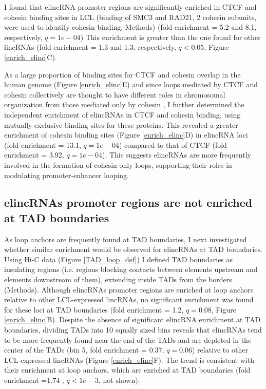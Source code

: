 \documentclass[11pt,a4paper]{report}
\begin{document}
I found that elincRNA promoter regions are significantly enriched in CTCF and cohesin binding sites in LCL (binding of SMC3 and RAD21, 2 cohesin subunits, were used to identify cohesin binding, Methods) (fold enrichment = 5.2 and 8.1, respectively, $q=1e-04$) This enrichment is greater than the one found for other lincRNAs (fold enrichment = 1.3 and 1.3, respectively, $q<0.05$, Figure \ref{enrich_elinc}C).

As a large proportion of binding sites for CTCF and cohesin overlap in the human genome (Figure \ref{enrich_elinc}E) and since loops mediated by CTCF and cohesin collectively are thought to have different roles in chromosomal organization from those mediated only by cohesin \cite{Ji2016}⁠, I further determined the independent enrichment of elincRNAs in CTCF and cohesin binding, using mutually exclusive binding sites for these proteins. This revealed a greater enrichment of cohesin binding sites (Figure \ref{enrich_elinc}D) in elincRNA loci (fold enrichment = 13.1, $q=1e-04$) compared to that of CTCF (fold enrichment = 3.92, $q=1e-04$). This suggests elincRNAs are more frequently involved in the formation of cohesin-only loops, supporting their roles in modulating promoter-enhancer looping.

\subsection*{elincRNAs promoter regions are not enriched at TAD boundaries}

As loop anchors are frequently found at TAD boundaries, I next investigated whether similar enrichment would be observed for elincRNAs at TAD boundaries. Using Hi-C data (Figure \ref{TAD_loop_def}) I defined TAD boundaries as insulating regions (i.e. regions blocking contacts between elements upstream and elements downstream of them), extending inside TADs from the borders (Methods). Although elincRNAs promoter regions are enriched at loop anchors relative to other LCL-expressed lincRNAs, no significant enrichment was found for these loci  at TAD boundaries (fold enrichment = 1.2, $q=0.08$, Figure \ref{enrich_elinc}B). Despite the absence of significant elincRNA enrichment at TAD boundaries, dividing TADs into 10 equally sized bins reveals that elincRNAs tend to be more frequently found near the end of the TADs and are depleted in the center of the TADs (bin 5, fold enrichment = 0.37, $q=0.06$) relative to other LCL-expressed lincRNAs (Figure \ref{enrich_elinc}F). The trend is consistent with their enrichment at loop anchors, which are enriched at TAD boundaries (fold enrichment =1.74 , $q<1e-3$, not shown).
\end{document}
